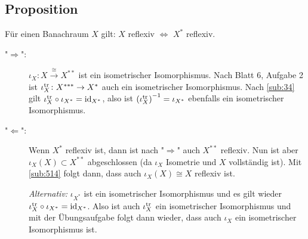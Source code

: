 \subsection[Proposition: Für Banachräume gilt: $X$ reflexiv $\iff$ $X^*$ reflexiv]{Proposition} %
\label{sub:515}
Für einen Banachraum $X$ gilt: $X$ reflexiv $\iff$ $X^*$ reflexiv.
\begin{description}
	\item["$\Rightarrow$":] $\iota_X\colon X\xrightarrow{\cong} X^{**}$ ist ein isometrischer Isomorphismus. Nach Blatt 6, Aufgabe 2 ist $\iota_X^{\tr}\colon X^{***}\to X^*$
	auch ein isometrischer Isomorphismus. Nach \ref{sub:34} gilt  $\iota_X^{\tr} \circ \iota_{X^*}= \id_{X^{*}}$, also ist $\enbrace*{\iota_X^\tr}^{-1} = \iota_{X^*}$
	ebenfalls ein isometrischer Isomorphismus.
	\item["$\Leftarrow$":] Wenn $X^*$ reflexiv ist, dann ist nach "$\Rightarrow$" auch $X^{**}$ reflexiv. Nun ist aber $\iota_X(X) \subset X^{**}$ abgeschlossen (da 
	$\iota_X$ Isometrie und $X$ vollständig ist). Mit \ref{sub:514} folgt dann, dass auch $\iota_X(X) \cong X$ reflexiv ist.\bewende
	
	\emph{Alternativ:} $\iota_{X^*}$ ist ein isometrischer Isomorphismus und es gilt wieder $\iota_{X}^\tr \circ \iota_{X^*}= \id_{X^*}$. Also ist auch $\iota_{X}^\tr$ ein 
	isometrischer Isomorphismus und mit der Übungsaufgabe folgt dann wieder, dass auch $\iota_X$ ein isometrischer Isomorphismus ist. \bewende
\end{description}


